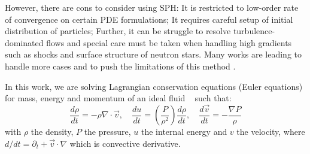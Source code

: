 However, there are cons to consider using SPH: 
It is restricted to low-order rate of convergence on certain PDE formulations; 
It requires careful setup of initial distribution of particles; 
Further, it can be struggle to resolve turbulence-dominated flows and special care must be taken when handling high gradients such as shocks and surface structure of neutron stars.
Many works are leading to handle more cases and to push the limitations of this method \cite{dai2017dual,lind2016incompressible,ren2016dual}.

In this work, we are solving Lagrangian conservation equations (Euler equations) for mass, energy and momentum of an ideal fluid ~\cite{Landau1959}  such that:
\begin{equation}
\frac{d \rho}{d t} = - \rho \nabla \cdot \vec{v}, \quad
\frac{d u}{d t} = \left( \frac{P}{\rho^2} \right) \frac{d \rho}{d t}, \quad
\frac{d \vec{v}}{d t} = - \frac{\nabla P}{\rho}
\end{equation}
with $\rho$ the density, $P$ the pressure, $u$ the internal energy and $v$ the velocity, where $d/dt = \partial_t + \vec{v} \cdot \nabla$ which is convective derivative.

